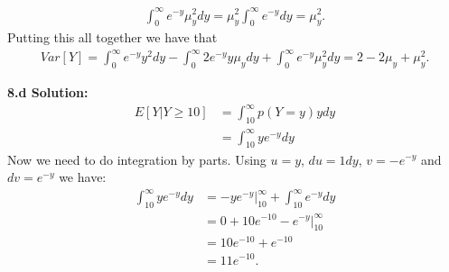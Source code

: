 \documentclass[a4paper]{article}
\begin{document}
\begin{align*}
\int_{0}^{\infty}e^{-y}\mu_y^2dy = \mu_y^2\int_{0}^{\infty}e^{-y}dy = \mu_y^2.
\end{align*}
Putting this all together we have that
\begin{align*}
Var[Y]= \int_{0}^{\infty} e^{-y}y^2 dy -\int_{0}^{\infty}2e^{-y}y\mu_y dy+\int_{0}^{\infty}e^{-y}\mu_y^2dy
= 2 -2\mu_y+\mu_y^2.
\end{align*}


\textbf{8.d Solution:}
\begin{align*}
E[Y|Y\geq 10] &= \int_{10}^{\infty} p(Y=y)y dy \\
&= \int_{10}^{\infty} ye^{-y} dy
\end{align*}
Now we need to do integration by parts. Using $u=y$,
$du=1dy$, $v=-e^{-y}$ and $dv=e^{-y}$ we have:
\begin{align*}
\int_{10}^{\infty} ye^{-y} dy
 &= -ye^{-y}|_{10}^{\infty} + \int_{10}^{\infty} e^{-y} dy \\
 &= 0 +10e^{-10}-e^{-y}|_{10}^{\infty} \\
 &= 10e^{-10}+e^{-10} \\
 &= 11e^{-10}.
\end{align*}
\end{document}
